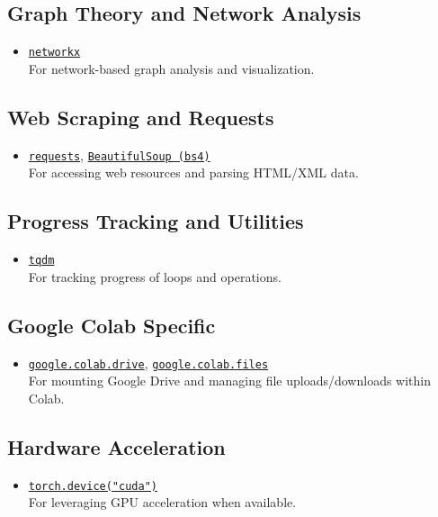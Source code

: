 \documentclass[11pt,a4paper,oneside]{report}
\begin{document}
\subsection*{Graph Theory and Network Analysis}
\begin{itemize}
    \item \href{https://networkx.org/}{\texttt{networkx}} \\
    For network-based graph analysis and visualization.
\end{itemize}

\subsection*{Web Scraping and Requests}
\begin{itemize}
    \item \href{https://requests.readthedocs.io/en/latest/}{\texttt{requests}}, \href{https://www.crummy.com/software/BeautifulSoup/bs4/doc/}{\texttt{BeautifulSoup (bs4)}} \\
    For accessing web resources and parsing HTML/XML data.
\end{itemize}

\subsection*{Progress Tracking and Utilities}
\begin{itemize}
    \item \href{https://tqdm.github.io/}{\texttt{tqdm}} \\
    For tracking progress of loops and operations.
\end{itemize}

\subsection*{Google Colab Specific}
\begin{itemize}
    \item \href{https://colab.research.google.com/notebooks/io.ipynb}{\texttt{google.colab.drive}}, \href{https://colab.research.google.com/notebooks/io.ipynb}{\texttt{google.colab.files}} \\
    For mounting Google Drive and managing file uploads/downloads within Colab.
\end{itemize}

\subsection*{Hardware Acceleration}
\begin{itemize}
    \item \href{https://pytorch.org/docs/stable/cuda.html}{\texttt{torch.device("cuda")}} \\
    For leveraging GPU acceleration when available.
\end{itemize}
\end{document}
